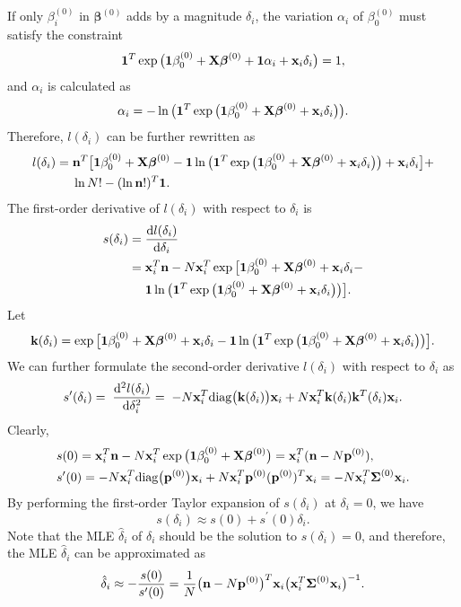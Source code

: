 If only $\beta_i^{(0)}$ in $\bm{\beta}^{(0)}$ adds by a magnitude $\delta_i$, the
variation $\alpha_i$ of $\beta^{(0)}_0$ must satisfy the constraint
\begin{equation}
\bm{1}^T\exp\big(\bm{1}\beta^{(0)}_0 +{\bf X}\bm\beta^{(0)}+\bm{1}\alpha_i+{\bf
x}_i\delta_i\big)=1,\label{F3.8}
\end{equation}
and $\alpha_i$ is calculated as
\begin{equation}
\alpha_i=-\ln\big(\bm{1}^T\exp\big(\bm{1}\beta^{(0)}_0 +{\bf X}\bm\beta^{(0)}+{\bf
x}_i\delta_i\big)\big).\label{F3.9}
\end{equation}
Therefore, $l(\delta_i)$ can be further rewritten as
\begin{align*}
l(\delta_i)=&\;{\bf n}^T\big[\boldsymbol{1}\beta^{(0)}_0 +{\bf
X}\boldsymbol\beta^{(0)}-\boldsymbol{1}\ln\big(\boldsymbol{1}^T\exp\big(\boldsymbol{1}\beta^{(0)}_0 +{\bf
X}\boldsymbol\beta^{(0)}+{\bf x}_i\delta_i\big)\big)+{\bf
x}_i\delta_i\big]+\\
&\;\ln N!-(\ln{\bf n}!)^T\boldsymbol{1}.
\end{align*}
The first-order derivative of $l(\delta_i)$ with respect to $\delta_i$ is
\begin{align*}
s(\delta_i)=&\;\frac{\mathrm{d}
l(\delta_i)}{\mathrm{d}\delta_i}\\
=&\;{\bf x}_i^T{\bf n}-N{\bf x}_i^T
\exp\big[\boldsymbol{1}\beta^{(0)}_0+{\bf X}\boldsymbol\beta^{(0)}+{\bf x}_i\delta_i-\\
&\;\boldsymbol{1}\ln\big(\boldsymbol{1}^T\exp\big(\boldsymbol{1}\beta^{(0)}_0 +{\bf X}\boldsymbol\beta^{(0)}+{\bf
x}_i\delta_i\big)\big)\big].
\end{align*}
Let
\[
{\bf k}(\delta_i)=\exp\big[\boldsymbol{1}\beta^{(0)}_0+{\bf X}\boldsymbol\beta^{(0)}+{\bf
x}_i\delta_i-\boldsymbol{1}\ln\big(\boldsymbol{1}^T\exp\big(\boldsymbol{1}\beta^{(0)}_0 +{\bf
X}\boldsymbol\beta^{(0)}+{\bf x}_i\delta_i\big)\big)\big].
\]
We can further formulate the second-order derivative $l(\delta_i)$ with respect to
$\delta_i$ as
\[
s^{\prime}(\delta_i)=\;\frac{\mathrm{d}^2 l(\delta_i)}{\mathrm{d}\delta^2_i}=\;-N{\bf
x}_i^T\mathrm{diag}\big({\bf k}(\delta_i)\big){\bf x}_i + N{\bf x}_i^T{\bf k}(\delta_i){\bf
k}^T(\delta_i){\bf x}_i.
\]
Clearly,
\begin{align*}
&s(0)={\bf x}_i^T{\bf n}-N{\bf x}_i^T \exp\big(\boldsymbol{1}\beta^{(0)}_0+{\bf
X}\boldsymbol\beta^{(0)}\big)={\bf x}_i^T({\bf
n}-N{\bf p}^{(0)}),\\
&s^{\prime}(0)=-N{\bf x}_i^T\mathrm{diag}\big({\bf p}^{(0)}\big){\bf x}_i+ N{\bf x}_i^T{\bf
p}^{(0)}({\bf p}^{(0)})^T{\bf x}_i=-N{\bf x}_i^T\boldsymbol{\Sigma}^{(0)}{\bf x}_i.
\end{align*}
By performing the first-order Taylor expansion of $s(\delta_i)$ at $\delta_i=0$, we
have
\[
s(\delta_i)\approx s(0)+s^{\prime}(0)\delta_i.
\]
Note that the MLE $\hat{\delta}_i$ of $\delta_i$ should be the solution to
$s(\delta_i)=0$, and therefore, the MLE $\hat{\delta}_i$ can be approximated as
\begin{equation}
\hat{\delta}_i\approx-\frac{s(0)}{s^{\prime}(0)}=\frac{1}{N}\big({\bf n}-N{\bf
p}^{(0)}\big)^T{\bf x}_i\big({\bf x}_i^T\bm{\Sigma}^{(0)}{\bf
x}_i\big)^{-1}.\label{F3.10}
\end{equation}

